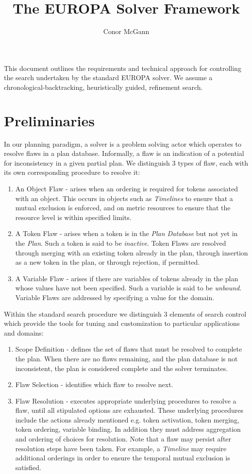 \documentclass[10pt, letterpaper, oneside]{article}
\author{Conor McGann}
\title{The EUROPA Solver Framework}
\begin{document}
\maketitle

This document outlines the requirements and technical approach for controlling the search undertaken by the standard EUROPA solver. We assume a chronological-backtracking, heuristically guided, refinement search.

\section{Preliminaries}
In our planning paradigm, a solver is a problem solving actor which operates to resolve flaws in a plan database. Informally, a flaw is an indication of a potential for inconsistency in a given partial plan. We distinguish 3 types of flaw, each with its own corresponding  procedure to resolve it:
\begin{enumerate}
\item An Object Flaw - arises when an ordering is required for tokens associated with an object. This occurs in objects such as {\em Timelines} to ensure that a mutual exclusion is enforced, and on metric resources to ensure that the resource level is within specified limits.
\item A Token Flaw - arises when a token is in the {\em Plan Database} but not yet in the {\em Plan}. Such a token is said to be {\em inactive}. Token Flaws are resolved through merging with an existing token already in the plan, through insertion as a new token in the plan, or through rejection, if permitted.
\item A Variable Flaw - arises if there are variables of tokens already in the plan whose values have not been specified. Such a variable is said to be {\em unbound}. Variable Flaws are addressed by specifying a value for the domain. 
\end{enumerate}

Within the standard search procedure we distinguish 3 elements of search control which provide the tools for tuning and customization to particular applications and domains:
\begin{enumerate}
\item Scope Definition - defines the set of flaws that must be resolved to complete the plan. When there are no flaws remaining, and the plan database is not inconsistent, the plan is considered complete and the solver terminates.
\item Flaw Selection - identifies which flaw to resolve next.
\item Flaw Resolution - executes appropriate underlying procedures to resolve a flaw, until all stipulated options are exhausted. These underlying procedures include the actions already mentioned e.g. token activation, token merging, token ordering, variable binding. In addition they must address aggregation and ordering of choices for resolution. Note that a flaw may persist after resolution steps have been taken. For example, a {\em Timeline} may require additional orderings in order to ensure the temporal mutual exclusion is satisfied.
\end{enumerate}
\end{document}
